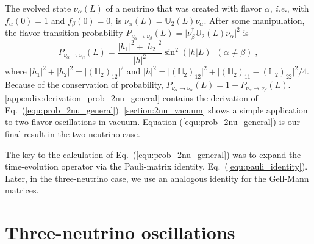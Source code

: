 \documentclass[final,5p,times,twocolumn]{elsarticle}
\newcommand{\ie}{{\it i.e.}}
\newcommand{\eq}{Eq.}
\newcommand{\equ}[1]{\eq~(\ref{equ:#1})}
\begin{document}
The evolved state $\nu_\alpha (L)$ of a neutrino that was created with flavor $\alpha$, \ie, with $f_\alpha(0) = 1$ and $f_\beta(0) = 0$, is $\nu_\alpha\left(L\right) = \mathbb{U}_2(L) \nu_\alpha$.  After some manipulation, the flavor-transition probability $P_{\nu_\alpha \to \nu_\beta}(L) = \lvert \nu_\beta^\dagger \mathbb{U}_2(L) \nu_\alpha \rvert^2$ is
\begin{equation}
 \label{equ:prob_2nu_general}
 P_{\nu_\alpha \to \nu_\beta}(L)
 = \frac{\left\vert h_1 \right\vert^2 + \left\vert h_2 \right\vert^2}
 {\left\vert h\right\vert^2} \sin^2\left(\left\vert h\right\vert L\right) \;\; (\alpha \neq \beta) \;,
\end{equation}
where $\lvert h_1 \rvert^2 + \lvert h_2 \rvert^2 = \lvert (\mathbb{H}_2)_{12} \rvert^2$ and $\lvert h \rvert^2 = \lvert (\mathbb{H}_2)_{12} \rvert^2 + \lvert (\mathbb{H}_2)_{11} - (\mathbb{H}_2)_{22} \rvert^2 / 4$.  Because of the conservation of probability, $P_{\nu_\alpha \rightarrow \nu_\alpha}\left(L\right) = 1 - P_{\nu_\alpha \rightarrow \nu_\beta}\left(L\right)$.  \ref{appendix:derivation_prob_2nu_general} contains the derivation of \equ{prob_2nu_general}.  \ref{section:2nu_vacuum} shows a simple application to two-flavor oscillations in vacuum.  Equation (\ref{equ:prob_2nu_general}) is our final result in the two-neutrino case.  

The key to the calculation of \equ{prob_2nu_general} was to expand the time-evolution operator via the Pauli-matrix identity, \equ{pauli_identity}.  Later, in the three-neutrino case, we use an analogous identity for the Gell-Mann matrices.




\section{Three-neutrino oscillations}
\label{section:three_flavors}
\end{document}
